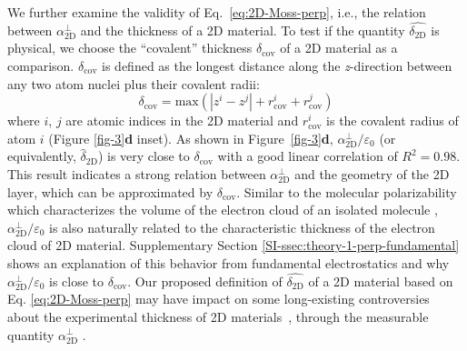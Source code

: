We further examine the validity of Eq.~\ref{eq:2D-Moss-perp}, i.e.,
the relation between $\alpha_{\mathrm{2D}}^{\perp}$ and the thickness
of a 2D material. To test if the quantity $\hat{\delta_{\mathrm{2D}}}$
is physical, we choose the ``covalent'' thickness
$\delta_{\mathrm{cov}}$ of a 2D material as a
comparison. $\delta_{\mathrm{cov}}$ is defined as the longest distance
along the \textit{z}-direction between any two atom nuclei plus their covalent
radii:
%
%
\begin{equation}
  \label{eq:cov-thick}
  \delta_{\mathrm{cov}} = \mathrm{max}(|z^{i} - z^{j}|
  + r^{i}_{\mathrm{cov}} + r^{j}_{\mathrm{cov}})
\end{equation}
where $i$, $j$ are atomic indices in the 2D material and
$r_{\mathrm{cov}}^{i}$ is the covalent radius of atom $i$ (Figure
\ref{fig-3}{\textbf d} inset). As shown in Figure~\ref{fig-3}{\textbf
  d}, $\alpha_{\mathrm{2D}}^{\perp}/\varepsilon_{0}$ (or equivalently,
$\hat{\delta}_{\mathrm{2D}}$) is very close to $\delta_{\mathrm{cov}}$
with a good linear correlation of $R^{2}=0.98$. This result indicates
a strong relation between $\alpha_{\mathrm{2D}}^{\perp}$ and the
geometry of the 2D layer, which can be approximated by
$\delta_{\mathrm{cov}}$. Similar to the molecular polarizability which
characterizes the volume of the electron cloud of an isolated molecule
\cite{Israelachvili_2011},
$\alpha_{\mathrm{2D}}^{\perp}/\varepsilon_{0}$ is also naturally
related to the characteristic thickness of the electron cloud of 2D
material. Supplementary Section
\ref{SI-ssec:theory-1-perp-fundamental} shows an explanation of this
behavior from fundamental electrostatics and why
$\alpha_{\mathrm{2D}}^{\perp} / \varepsilon_{0}$ is close to
$\delta_{\mathrm{cov}}$. Our proposed definition of
$\hat{\delta_{\mathrm{2D}}}$ of a 2D material based on
Eq. \ref{eq:2D-Moss-perp} may have impact
on some long-existing controversies about the experimental thickness
of 2D materials~\cite{Shearer_2016}, through the
measurable quantity $\alpha_{\mathrm{2D}}^{\perp}$
\cite{Antoine_1999,Cherniavskaya_2003,Krauss_1999_EFM}.
% 
%


